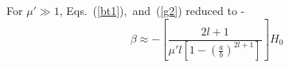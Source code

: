 


For $\mu'\gg 1$, Eqs.~(\ref{bt1}),~and~(\ref{g2}) reduced to -
\begin{equation}\label{bt2}
\beta\approx-\left[\frac{2l+1}{\mu'l\left[1-\left(\frac{a}{b}\right)^{2l+1}\right]}\right]H_0
\end{equation}

